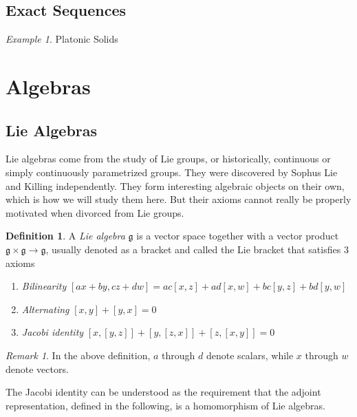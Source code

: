 \documentclass[12pt]{article}
\theoremstyle{definition}
\newtheorem{definition}{Definition}[section]
\theoremstyle{remark}
\newtheorem*{remark}{Remark}
\theoremstyle{example}
\newtheorem{example}{Example}
\theoremstyle{theorem}
\theoremstyle{lemma}
\begin{document}
\subsection{Exact Sequences}

\begin{example}
	Platonic Solids
\end{example}

\section{Algebras}

\subsection{Lie Algebras}

Lie algebras come from the study of Lie groups, or historically, continuous or simply continuously parametrized groups. They were discovered by Sophus Lie and Killing independently. They form interesting algebraic objects on their own, which is how we will study them here. But their axioms cannot really be properly motivated when divorced from Lie groups.

\begin{definition}
	A \textit{Lie algebra} $\mathfrak{g}$ is a vector space together with a vector product $\mathfrak{g}\times\mathfrak{g}\to\mathfrak{g}$, usually denoted as a bracket and called the Lie bracket that satisfies 3 axioms
	\begin{enumerate}
		\item \textit{Bilinearity}
		\subitem $[ax+by,cz+dw]=ac[x,z]+ad[x,w]+bc[y,z]+bd[y,w]$
		\item \textit{Alternating}
		\subitem $[x,y]+[y,x]=0$
		\item \textit{Jacobi identity}
		\subitem $[x,[y,z]]+[y,[z,x]]+[z,[x,y]]=0$
	\end{enumerate}
\end{definition}

\begin{remark}
	In the above definition, $a$ through $d$ denote scalars, while $x$ through $w$ denote vectors.
	
	The Jacobi identity can be understood as the requirement that the adjoint representation, defined in the following, is a homomorphism of Lie algebras.
\end{remark}
\end{document}
